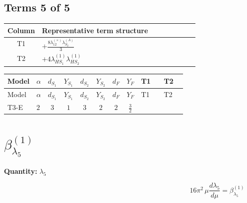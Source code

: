 \documentclass[8pt]{article}
\begin{document}
\begin{landscape}
\subsection*{Terms 5 of 5}
\begin{center}
\begin{tabular}{@{}c >{\raggedright\arraybackslash}p{0.82\linewidth}@{}}
\toprule
Column & Representative term structure \\
\midrule
T1 & \(\displaystyle +\frac{8 {\lambda_{12}^{(\times)}} {\lambda_{S_2}^{(A)}}}{3}\) \\
\midrule
T2 & \(\displaystyle +4 {\lambda_{HS_1}^{(1)}} {\lambda_{HS_2}^{(1)}}\) \\
\midrule
\bottomrule
\end{tabular}
\end{center}
\smallskip
\tiny
\begin{longtable}{@{}llcccccc >{\raggedright\arraybackslash}p{0.21\linewidth} >{\raggedright\arraybackslash}p{0.21\linewidth}@{}}
\toprule
Model & $\alpha$ & $d_{S_1}$ & $Y_{S_1}$ & $d_{S_2}$ & $Y_{S_2}$ & $d_F$ & $Y_F$ & T1 & T2 \\
\midrule
\endfirsthead
\toprule
Model & $\alpha$ & $d_{S_1}$ & $Y_{S_1}$ & $d_{S_2}$ & $Y_{S_2}$ & $d_F$ & $Y_F$ & T1 & T2 \\
\midrule
\endhead
T3-E & $2$ & $3$ & $1$ & $3$ & $2$ & $2$ & $\frac{3}{2}$ & \scriptsize\adjustbox{max width=\linewidth}{$\begin{gathered} +\frac{8 {\lambda_{12}^{(\times)}} {\lambda_{S_2}^{(A)}}}{3}\end{gathered}$} & \scriptsize\adjustbox{max width=\linewidth}{$\begin{gathered} +4 {\lambda_{HS_1}^{(1)}} {\lambda_{HS_2}^{(1)}}\end{gathered}$} \\
\midrule
\bottomrule
\end{longtable}
\clearpage
\section*{$\beta_{\lambda_5}^{(1)}$}
\noindent\textbf{Quantity: }$\lambda_5$\par\smallskip
\[16\pi^2\,\mu\frac{d \lambda_5}{d\mu}=\beta_{\lambda_5}^{(1)}\]

\end{landscape}
\end{document}
